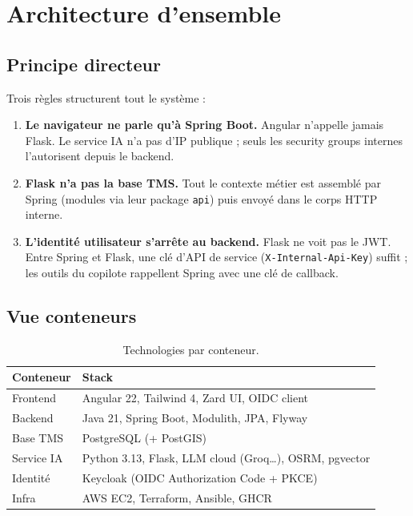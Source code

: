 \chapter{Architecture d'ensemble}
\label{chap:architecture}

\section{Principe directeur}

Trois règles structurent tout le système :

\begin{enumerate}[leftmargin=*]
  \item \textbf{Le navigateur ne parle qu'à Spring Boot.} Angular n'appelle jamais Flask. Le service IA n'a pas d'IP publique ; seuls les security groups internes l'autorisent depuis le backend.
  \item \textbf{Flask n'a pas la base TMS.} Tout le contexte métier est assemblé par Spring (modules via leur package \texttt{api}) puis envoyé dans le corps HTTP interne.
  \item \textbf{L'identité utilisateur s'arrête au backend.} Flask ne voit pas le JWT. Entre Spring et Flask, une clé d'API de service (\texttt{X-Internal-Api-Key}) suffit ; les outils du copilote rappellent Spring avec une clé de callback.
\end{enumerate}

\section{Vue conteneurs}


\begin{table}[ht]
\centering
\caption{Technologies par conteneur.}
\label{tab:stack}
\begin{tabular}{@{}ll@{}}
\toprule
Conteneur & Stack \\
\midrule
Frontend & Angular 22, Tailwind 4, Zard UI, OIDC client \\
Backend & Java 21, Spring Boot, Modulith, JPA, Flyway \\
Base TMS & PostgreSQL (+ PostGIS) \\
Service IA & Python 3.13, Flask, LLM cloud (Groq\ldots), OSRM, pgvector \\
Identité & Keycloak (OIDC Authorization Code + PKCE) \\
Infra & AWS EC2, Terraform, Ansible, GHCR \\
\bottomrule
\end{tabular}
\end{table}

